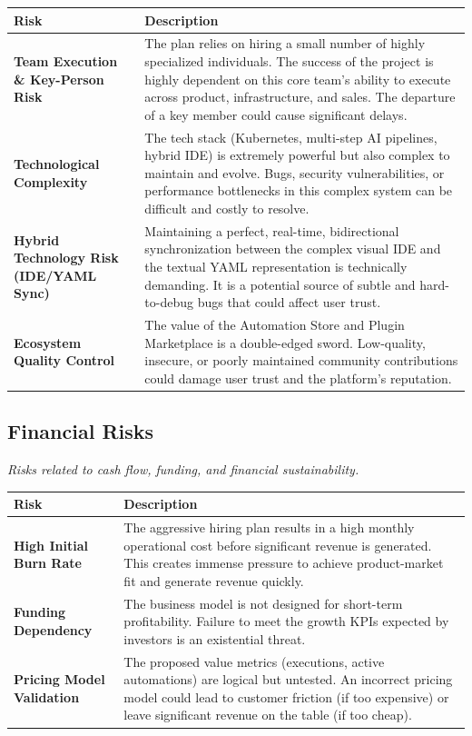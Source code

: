 \documentclass[11pt, a4paper, oneside]{article}
\begin{document}
\begin{table}[H]
\centering
\begin{tabularx}{\textwidth}{@{}lL@{}}
\toprule
\textbf{Risk} & \textbf{Description} \\
\midrule
\textbf{Team Execution \& Key-Person Risk} & The plan relies on hiring a small number of highly specialized individuals. The success of the project is highly dependent on this core team's ability to execute across product, infrastructure, and sales. The departure of a key member could cause significant delays. \\
\addlinespace
\textbf{Technological Complexity} & The tech stack (Kubernetes, multi-step AI pipelines, hybrid IDE) is extremely powerful but also complex to maintain and evolve. Bugs, security vulnerabilities, or performance bottlenecks in this complex system can be difficult and costly to resolve. \\
\addlinespace
\textbf{Hybrid Technology Risk (IDE/YAML Sync)} & Maintaining a perfect, real-time, bidirectional synchronization between the complex visual IDE and the textual YAML representation is technically demanding. It is a potential source of subtle and hard-to-debug bugs that could affect user trust. \\
\addlinespace
\textbf{Ecosystem Quality Control} & The value of the Automation Store and Plugin Marketplace is a double-edged sword. Low-quality, insecure, or poorly maintained community contributions could damage user trust and the platform's reputation. \\
\bottomrule
\end{tabularx}
\end{table}

\newpage
\subsection{Financial Risks}
\textit{Risks related to cash flow, funding, and financial sustainability.}

\begin{table}[H]
\centering
\begin{tabularx}{\textwidth}{@{}lL@{}}
\toprule
\textbf{Risk} & \textbf{Description} \\
\midrule
\textbf{High Initial Burn Rate} & The aggressive hiring plan results in a high monthly operational cost  before significant revenue is generated. This creates immense pressure to achieve product-market fit and generate revenue quickly. \\
\addlinespace
\textbf{Funding Dependency} & The business model is not designed for short-term profitability. Failure to meet the growth KPIs expected by investors is an existential threat. \\
\addlinespace
\textbf{Pricing Model Validation} & The proposed value metrics (executions, active automations) are logical but untested. An incorrect pricing model could lead to customer friction (if too expensive) or leave significant revenue on the table (if too cheap). \\
\bottomrule
\end{tabularx}
\end{table}
\end{document}
